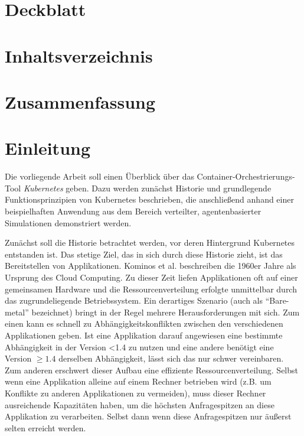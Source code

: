 \documentclass[11pt,a4paper]{article}
\begin{document}
\section{Deckblatt}
\section{Inhaltsverzeichnis}



\section{Zusammenfassung}

\section{Einleitung}
\label{sec:einleitung}
Die vorliegende Arbeit soll einen Überblick über das Container-Orchestrierungs-Tool \emph{Kubernetes} geben. 
Dazu werden zunächst Historie und grundlegende Funktionsprinzipien von Kubernetes beschrieben, die anschließend
anhand einer beispielhaften Anwendung aus dem Bereich verteilter, agentenbasierter Simulationen demonstriert werden.

Zunächst soll die Historie betrachtet werden, vor deren Hintergrund Kubernetes entstanden ist.
Das stetige Ziel, das in sich durch diese Historie zieht, ist das Bereitstellen von Applikationen.
Kominos et al. \cite{7899247} beschreiben die 1960er Jahre als Ursprung des Cloud Computing.
Zu dieser Zeit liefen Applikationen oft auf einer gemeinsamen Hardware und die Ressourcenverteilung erfolgte unmittelbar durch das zugrundeliegende Betriebssystem.
Ein derartiges Szenario (auch als ``Bare-metal'' bezeichnet) bringt in der Regel mehrere Herausforderungen mit sich.
Zum einen kann es schnell zu Abhängigkeitskonflikten zwischen den verschiedenen Applikationen geben.
Ist eine Applikation darauf angewiesen eine bestimmte Abhängigkeit in der Version <1.4 zu nutzen und eine andere
benötigt eine Version \(\geq 1.4\) derselben Abhängigkeit, lässt sich das nur schwer vereinbaren.
Zum anderen erschwert dieser Aufbau eine effiziente Ressourcenverteilung. Selbst wenn eine Applikation alleine auf einem Rechner betrieben wird (z.B. um Konflikte zu anderen
Applikationen zu vermeiden), muss dieser Rechner ausreichende Kapazitäten haben, um die höchsten Anfragespitzen an diese Applikation zu verarbeiten.
Selbst dann wenn diese Anfragespitzen nur äußerst selten erreicht werden.
\end{document}
